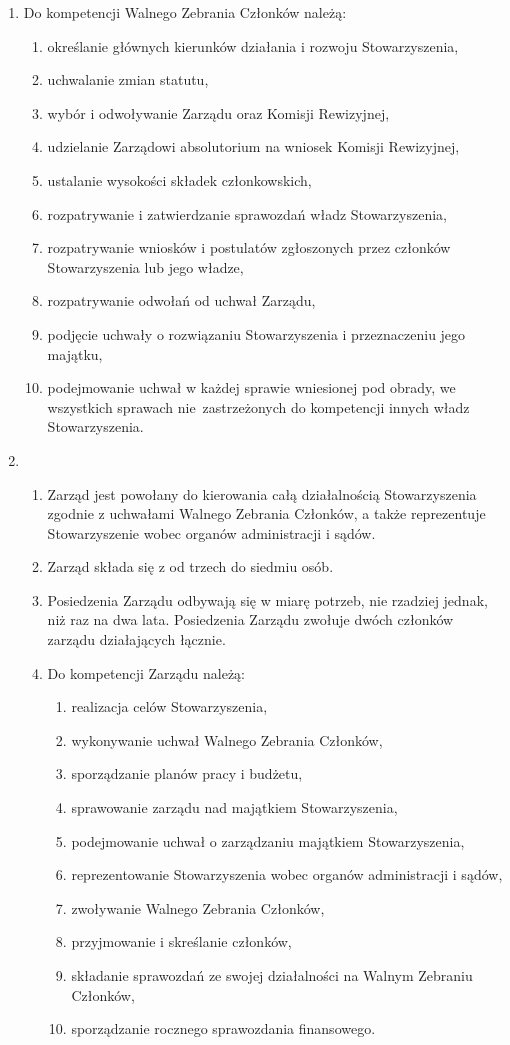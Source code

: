 \documentclass[chapterprefix,notitlepage]{article}
\begin{document}
\begin{enumerate}
	\item Do kompetencji Walnego Zebrania Członków należą:
	\begin{enumerate}[1)]
	\item określanie głównych kierunków działania i rozwoju Stowarzyszenia,
	\item uchwalanie zmian statutu,
	\item wybór i odwoływanie Zarządu oraz Komisji Rewizyjnej,
	\item udzielanie Zarządowi absolutorium na wniosek Komisji Rewizyjnej,
	\item ustalanie wysokości składek członkowskich,
	\item rozpatrywanie i zatwierdzanie sprawozdań władz Stowarzyszenia,
	\item rozpatrywanie wniosków i postulatów zgłoszonych przez członków Stowarzyszenia lub jego władze,
	\item rozpatrywanie odwołań od uchwał Zarządu,
	\item podjęcie uchwały o rozwiązaniu Stowarzyszenia i przeznaczeniu jego majątku,
	\item podejmowanie uchwał w każdej sprawie wniesionej pod obrady, we wszystkich sprawach nie~zastrzeżonych do kompetencji innych władz Stowarzyszenia.
	\end{enumerate}
	
	\item \begin{enumerate}
		\item Zarząd jest powołany do kierowania całą działalnością Stowarzyszenia zgodnie z uchwałami Walnego Zebrania Członków, a także reprezentuje Stowarzyszenie wobec organów administracji i sądów.
		\item Zarząd składa się z od trzech do siedmiu osób.
		\item Posiedzenia Zarządu odbywają się w miarę potrzeb, nie rzadziej jednak, niż raz na dwa lata. Posiedzenia Zarządu zwołuje dwóch członków zarządu działających łącznie.
		\item Do kompetencji Zarządu należą:
		\begin{enumerate}
			\item realizacja celów Stowarzyszenia,
			\item wykonywanie uchwał Walnego Zebrania Członków,
			\item sporządzanie planów pracy i budżetu,
			\item sprawowanie zarządu nad majątkiem Stowarzyszenia,
			\item podejmowanie uchwał o zarządzaniu majątkiem Stowarzyszenia,
			\item reprezentowanie Stowarzyszenia wobec organów administracji i sądów,
			\item zwoływanie Walnego Zebrania Członków,
			\item przyjmowanie i skreślanie członków,
			\item składanie sprawozdań ze swojej działalności na Walnym Zebraniu Członków,
			\item sporządzanie rocznego sprawozdania finansowego.
		\end{enumerate}
	\end{enumerate}


\end{enumerate}
\end{document}

